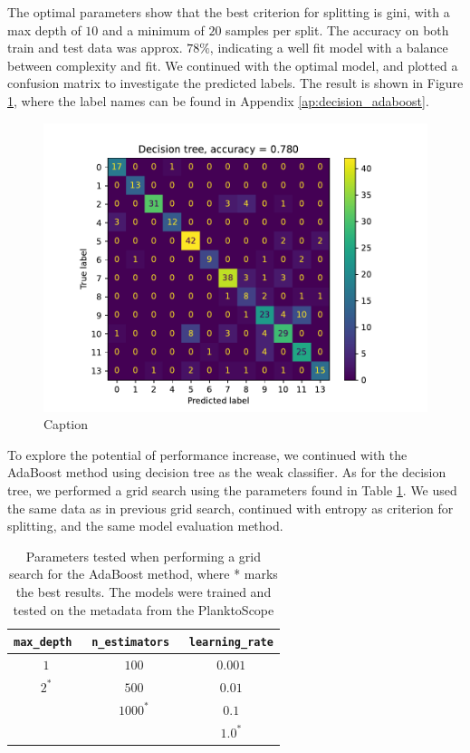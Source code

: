 The optimal parameters show that the best criterion for splitting is gini, with a max depth of $10$ and a minimum of $20$ samples per split. The accuracy on both train and test data was approx. $78\%$, indicating a well fit model with a balance between complexity and fit. 
We continued with the optimal model, and plotted a confusion matrix to investigate the predicted labels. The result is shown in Figure \ref{fig:cm_tree_metadata}, where the label names can be found in Appendix \ref{ap:decision_adaboost}.
\begin{figure}
    \centering
    \includegraphics[width=\linewidth]{latex/figures/cm_tree_planktoscope_metadata.pdf}
    \caption{Caption}
    \label{fig:cm_tree_metadata}
\end{figure}

To explore the potential of performance increase, we continued with the AdaBoost method using decision tree as the weak classifier. As for the decision tree, we performed a grid search using the parameters found in Table \ref{tab:params_adaboost}. We used the same data as in previous grid search, continued with entropy as criterion for splitting, and the same model evaluation method.
\begin{table}[h]
    \centering
    \begin{tabular}{ccc}
        \hline
        \verb|max_depth| \, & \verb|n_estimators| \, & \verb|learning_rate| \\
        \hline 
        $1$ & $100$ & $0.001$ \\
        $2^*$ & $500$ & $0.01$ \\
         & $1000^*$ & $0.1$ \\
         & & $1.0^*$ \\
        \hline
    \end{tabular}
    \caption{Parameters tested when performing a grid search for the AdaBoost method, where * marks the best results. The models were trained and tested on the metadata from the PlanktoScope}
    \label{tab:params_adaboost}
\end{table}

